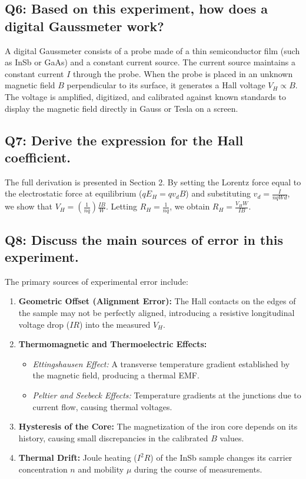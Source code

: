 \documentclass[a4paper,11pt]{article}
\begin{document}
\subsection*{Q6: Based on this experiment, how does a digital Gaussmeter work?}
A digital Gaussmeter consists of a probe made of a thin semiconductor film (such as InSb or GaAs) and a constant current source. 
The current source maintains a constant current $I$ through the probe. When the probe is placed in an unknown magnetic field $B$ perpendicular to its surface, it generates a Hall voltage $V_H \propto B$. 
The voltage is amplified, digitized, and calibrated against known standards to display the magnetic field directly in Gauss or Tesla on a screen.

\subsection*{Q7: Derive the expression for the Hall coefficient.}
The full derivation is presented in Section 2. By setting the Lorentz force equal to the electrostatic force at equilibrium ($q E_H = q v_d B$) and substituting $v_d = \frac{I}{n q W d}$, we show that $V_H = \left(\frac{1}{n q}\right)\frac{I B}{W}$. Letting $R_H = \frac{1}{n q}$, we obtain $R_H = \frac{V_H W}{I B}$.

\subsection*{Q8: Discuss the main sources of error in this experiment.}
The primary sources of experimental error include:
\begin{enumerate}
    \item {\bf Geometric Offset (Alignment Error):} The Hall contacts on the edges of the sample may not be perfectly aligned, introducing a resistive longitudinal voltage drop ($I R$) into the measured $V_H$.
    \item {\bf Thermomagnetic and Thermoelectric Effects:} 
    \begin{itemize}
        \item {\it Ettingshausen Effect:} A transverse temperature gradient established by the magnetic field, producing a thermal EMF.
        \item {\it Peltier and Seebeck Effects:} Temperature gradients at the junctions due to current flow, causing thermal voltages.
    \end{itemize}
    \item {\bf Hysteresis of the Core:} The magnetization of the iron core depends on its history, causing small discrepancies in the calibrated $B$ values.
    \item {\bf Thermal Drift:} Joule heating ($I^2 R$) of the InSb sample changes its carrier concentration $n$ and mobility $\mu$ during the course of measurements.
\end{enumerate}
\end{document}
